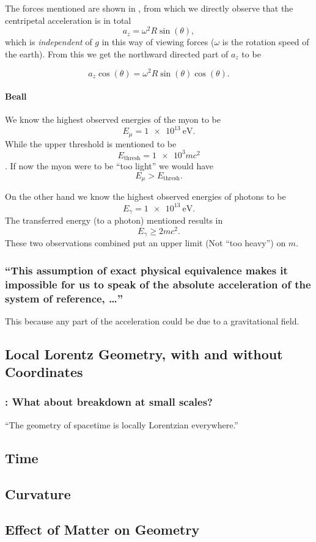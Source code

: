 The forces mentioned are shown in , from which we directly observe that the centripetal acceleration is in total
\[a_z=\omega^2 R \sin(\theta),\]
which is \emph{independent} of $g$ in this way of viewing forces ($\omega$ is the rotation speed of the earth).
From this we get the northward directed part of $a_z$  to be 

\[a_z \cos(\theta)=\omega^2 R \sin(\theta)\cos(\theta).\]

\paragraph{Beall}
We know the highest observed energies of the myon to be \[E_\mu = \SI{1e13}{\electronvolt}.\]
While the upper threshold is mentioned to be \[E_{\text{thresh}}=\num{1e3} m c^2\].
If now the myon were to be \enquote{too light} we would have \[E_\mu>E_{\text{thresh}}.\]

On the other hand we know the highest observed energies of photons to be \[E_\gamma=\SI{1e13}{\electronvolt}.\]
The transferred energy (to a photon) mentioned results in \[E_\gamma\geq 2 m c^2.\] These two observations combined put an upper limit (Not \enquote{too heavy}) on $m$.

\subsubsection{\enquote{This assumption of exact physical equivalence makes it impossible for us to speak of the absolute acceleration of the system of reference, \dots} }
This because any part of the acceleration could be due to a gravitational field.


\subsection{Local Lorentz Geometry, with and without Coordinates}\label{susec:1_4}
\subsubsection{\hint: What about breakdown at small scales? }
\enquote{The geometry of spacetime is locally Lorentzian everywhere.}

\subsection{Time}\label{susec:1_5}

\subsection{Curvature}\label{susec:1_6}

\subsection{Effect of Matter on Geometry}\label{susec:1_7}


